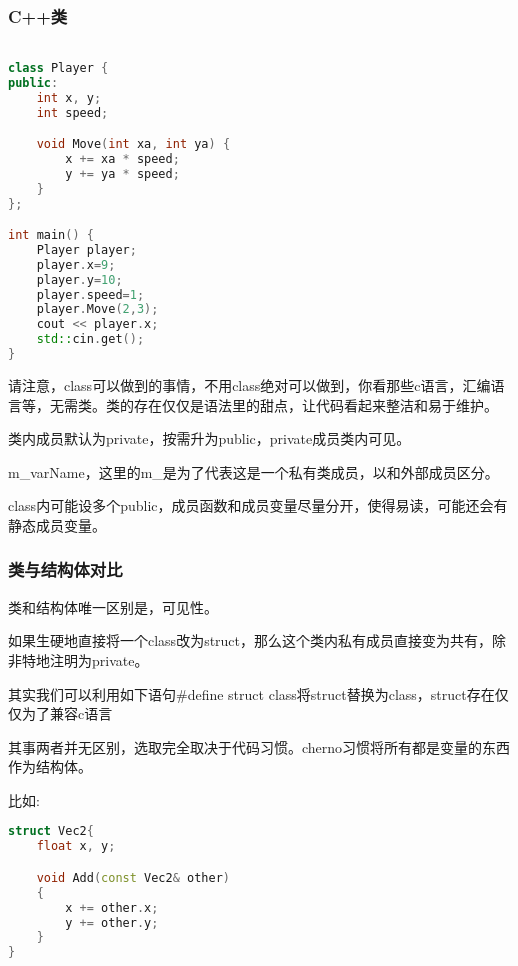     
\subsubsection{C++类}

\begin{lstlisting}[language=c++]

class Player {
public:
    int x, y;
    int speed;

    void Move(int xa, int ya) {
        x += xa * speed;
        y += ya * speed;
    }
};

int main() {
    Player player;
    player.x=9;
    player.y=10;
    player.speed=1;
    player.Move(2,3);
    cout << player.x;
    std::cin.get();
}
\end{lstlisting}
    
请注意，class可以做到的事情，不用class绝对可以做到，你看那些c语言，汇编语言等，无需类。类的存在仅仅是语法里的甜点，让代码看起来整洁和易于维护。

类内成员默认为{\ncodestyle private}，按需升为{\ncodestyle public}，{\ncodestyle private}成员类内可见。

{\ncodestyle m_varName}，这里的m_是为了代表这是一个私有类成员，以和外部成员区分。

{\ncodestyle class}内可能设多个{\ncodestyle public}，成员函数和成员变量尽量分开，使得易读，可能还会有静态成员变量。

    
\subsubsection{类与结构体对比}

类和结构体唯一区别是，可见性。

如果生硬地直接将一个{\ncodestyle class}改为{\ncodestyle struct}，那么这个类内私有成员直接变为共有，除非特地注明为{\ncodestyle private}。

其实我们可以利用如下语句{\ncodestyle \#define struct class}将struct替换为class，struct存在仅仅为了兼容c语言

其事两者并无区别，选取完全取决于代码习惯。cherno习惯将所有都是变量的东西作为结构体。

比如:

\begin{lstlisting}[language=c++]
struct Vec2{
    float x, y;

    void Add(const Vec2& other)
    {
        x += other.x;
        y += other.y;
    }
}
\end{lstlisting}

